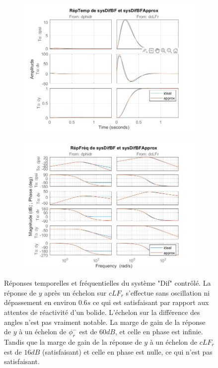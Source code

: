 \documentclass{report}
\begin{document}
\begin{figure}[h]  %
    \begin{subfigure}{.5\textwidth}
        \centering
        \includegraphics[width=\textwidth]{figures/reptempdifbf_approx.jpg}        
      \end{subfigure}    
      \begin{subfigure}{.5\textwidth}
        \centering
        \includegraphics[width=\textwidth]{figures/repfreqdifbf_approx.jpg}
      \end{subfigure}    
      \caption{
        Réponses temporelles et fréquentielles 
      du système "Dif" contrôlé.
      La réponse de $y$ après un échelon sur $cLF_r$ s'effectue 
      sans oscillation ni dépassement en environ $0.6s$ ce qui est 
      satisfaisant par rapport aux attentes de réactivité d'un bolide.
      L'échelon sur la différence des angles n'est pas vraiment notable.
      La marge de gain de la réponse de $y$ à un échelon de $\phi^-_r$
      est de $60 dB$, et celle en phase est infinie.
      Tandis que la marge de gain de la réponse de $y$ à 
      un échelon de $cLF_r$ est de $16 dB$ (satisfaisant) et celle en phase est nulle, 
      ce qui n'est pas satisfaisant.}
\end{figure}
\end{document}
